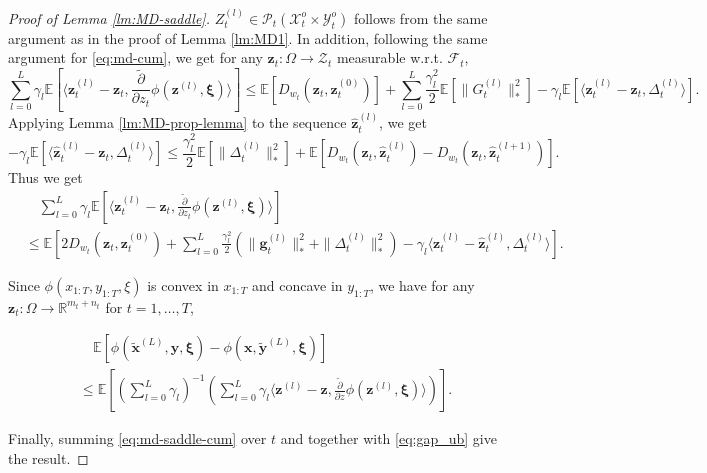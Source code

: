 \documentclass[11pt,fullpage,letterpaper]{article}
\newcommand{\mc}{\mathcal}
\newcommand{\mb}{\mathbf}
\newcommand{\R}{\mathbb{R}}
\newcommand{\E}{\mathbb{E}}
\newcommand{\bx}{\boldsymbol{\xi}}
\begin{document}
\begin{proof}[Proof of Lemma \ref{lm:MD-saddle}] $Z_t^{(l)}\in \mc P_t(\mc X_t^o \times \mc Y_t^o)$ follows from the same argument as in the proof of Lemma \ref{lm:MD1}. In addition, following the same argument for \eqref{eq:md-cum}, we get for any $\mb z_t:\Omega\to \mc Z_t$ measurable w.r.t. $\mc F_t$, 
\begin{displaymath}
    \sum_{l=0}^L\gamma_l\E[\langle \mb z_{t}^{(l)} - \mb z_t,\frac{\tilde{\partial}}{\partial z_t}\phi(\mb z^{(l)},\bx)\rangle]\leq \E[D_{w_t}(\mb z_t,\mb z^{(0)}_t)]+
   \sum_{l=0}^L \frac{\gamma_l^2}{2}\E[\|G^{(l)}_t\|_*^2] -\gamma_l\E[\langle \mb z_{t}^{(l)} - \mb z_t,\Delta_t^{(l)}\rangle].
\end{displaymath}
Applying Lemma \ref{lm:MD-prop-lemma} to the sequence $\widehat{\mb z}_t^{(l)}$, we get 
\begin{displaymath}
    -\gamma_l \E[\langle\widehat{\mb z}_{t}^{(l)} - \mb z_t,\Delta_t^{(l)}\rangle]\leq  \frac{\gamma_l^2}{2}\E[\|\Delta_t^{(l)}\|_*^2] + \E[D_{w_t}(\mb z_t,\widehat{\mb z}^{(l)}_t) - D_{w_t}(\mb z_t,\widehat{\mb z}^{(l+1)}_t)].
\end{displaymath}
Thus we get
\begin{align}\label{eq:md-saddle-cum}
    &\quad \sum_{l=0}^L\gamma_l\E[\langle \mb z_{t}^{(l)} - \mb z_t,\frac{\tilde{\partial}}{\partial z_t}\phi(\mb z^{(l)},\bx)\rangle]\nonumber\\
    &\leq \E[2D_{w_t}(\mb z_t,\mb z^{(0)}_t)+
   \sum_{l=0}^L \frac{\gamma_l^2}{2}(\|\mb g^{(l)}_t\|_*^2 +\|\Delta_t^{(l)}\|_*^2 )-\gamma_l\langle \mb z_{t}^{(l)} - \widehat{\mb z}_t^{(l)},\Delta_t^{(l)}\rangle].
\end{align}
     
Since $\phi(x_{1:T},y_{1:T},\xi)$ is convex in $x_{1:T}$ and concave in $y_{1:T}$, we have for any $\mb z_t:\Omega\to \R^{m_t+n_t}$ for $t=1,\ldots,T$,
   
    \begin{align}\label{eq:gap_ub}
        &\quad \E[\phi(\widetilde{\mb x}^{(L)},\mb y,\bx) -\phi(\mb x,\widetilde{\mb y}^{(L)},\bx) ]\nonumber\\
        &\leq \E[\left(\sum_{l=0}^L \gamma_l\right)^{-1}\left(\sum_{l=0}^L\gamma_l  \langle 
        \mb z^{(l)} - \mb z,\frac{\tilde{\partial}}{\partial z}\phi(\mb z^{(l)},\bx)\rangle\right)]. 
    \end{align}



Finally, summing \eqref{eq:md-saddle-cum} over $t$ and together with \eqref{eq:gap_ub} give the result.
\end{proof}
\end{document}

